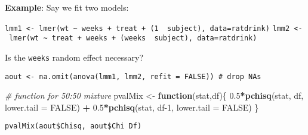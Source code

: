 \documentclass[
]{article}
\newenvironment{Shaded}{\begin{snugshade}}{\end{snugshade}}
\newcommand{\AttributeTok}[1]{\textcolor[rgb]{0.13,0.29,0.53}{#1}}
\newcommand{\CommentTok}[1]{\textcolor[rgb]{0.56,0.35,0.01}{\textit{#1}}}
\newcommand{\ConstantTok}[1]{\textcolor[rgb]{0.56,0.35,0.01}{#1}}
\newcommand{\ControlFlowTok}[1]{\textcolor[rgb]{0.13,0.29,0.53}{\textbf{#1}}}
\newcommand{\DecValTok}[1]{\textcolor[rgb]{0.00,0.00,0.81}{#1}}
\newcommand{\FloatTok}[1]{\textcolor[rgb]{0.00,0.00,0.81}{#1}}
\newcommand{\FunctionTok}[1]{\textcolor[rgb]{0.13,0.29,0.53}{\textbf{#1}}}
\newcommand{\NormalTok}[1]{#1}
\newcommand{\OtherTok}[1]{\textcolor[rgb]{0.56,0.35,0.01}{#1}}
\newcommand{\SpecialCharTok}[1]{\textcolor[rgb]{0.81,0.36,0.00}{\textbf{#1}}}
\begin{document}
\textbf{Example}: Say we fit two models:

\texttt{lmm1\ \textless{}-\ lmer(wt\ \textasciitilde{}\ weeks\ +\ treat\ +\ (1\ \textbar{}\ subject),\ data=ratdrink)}
\texttt{lmm2\ \textless{}-\ lmer(wt\ \textasciitilde{}\ treat\ +\ weeks\ +\ (weeks\ \textbar{}\ subject),\ data=ratdrink)}

Is the \texttt{weeks} random effect necessary?

\texttt{aout\ \textless{}-\ na.omit(anova(lmm1,\ lmm2,\ refit\ =\ FALSE))\ \#\ drop\ NAs}

\begin{Shaded}
\begin{Highlighting}[]
\CommentTok{\# function for 50:50 mixture}
\NormalTok{pvalMix }\OtherTok{\textless{}{-}} \ControlFlowTok{function}\NormalTok{(stat,df)\{}
  \FloatTok{0.5}\SpecialCharTok{*}\FunctionTok{pchisq}\NormalTok{(stat, df, }\AttributeTok{lower.tail =} \ConstantTok{FALSE}\NormalTok{) }\SpecialCharTok{+}
    \FloatTok{0.5}\SpecialCharTok{*}\FunctionTok{pchisq}\NormalTok{(stat, df}\DecValTok{{-}1}\NormalTok{, }\AttributeTok{lower.tail =} \ConstantTok{FALSE}\NormalTok{)}
\NormalTok{\}}
\end{Highlighting}
\end{Shaded}

\texttt{pvalMix(aout\$Chisq,\ aout\$\textasciigrave{}Chi\ Df\textasciigrave{})}
\end{document}
